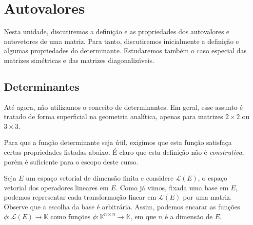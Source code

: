 \chapter{Autovalores}

Nesta unidade, discutiremos a definição e as propriedades dos autovalores e autovetores de uma matriz. Para tanto, discutiremos inicialmente a definição e algumas propriedades do determinante. Estudaremos também o caso especial das matrizes simétricas e das matrizes diagonalizáveis.

\section{Determinantes}

Até agora, não utilizamos o conceito de determinantes. Em geral, esse assunto é tratado de forma superficial na geometria analítica, apenas para matrizes $2\times 2$ ou $3\times 3$.

Para que a função determinante seja útil, exigimos que esta função satisfaça certas propriedades listadas abaixo. É claro que esta definição não é \emph{construtiva}, porém é suficiente para o escopo deste curso.

Seja $E$ um espaço vetorial de dimensão finita e considere ${\mathcal{L}}(E)$, o espaço vetorial dos operadores lineares em $E$. Como já vimos, fixada uma base em $E$, podemos representar cada transformação linear em ${\mathcal{L}}(E)$ por uma matriz. Observe que a escolha da base é arbitrária. Assim, podemos encarar as funções $\phi:{\mathcal{L}}(E)\to {\mathbb{K}}$ como funções $\phi:{\mathbb{K}}^{n\times n}\to {\mathbb{K}}$, em que $n$ é a dimensão de $E$. 

